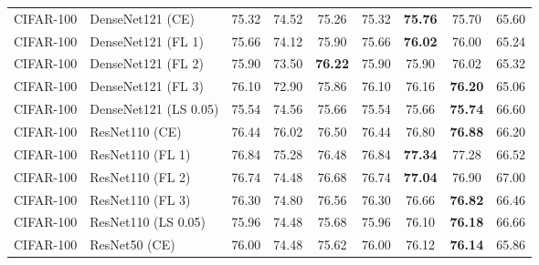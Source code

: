 \begin{table}[h!]
{\begin{tabular}{llccccccc}
   CIFAR-100 &            DenseNet121 (CE) &                  75.32 &                  74.52 &                  75.26 &                  75.32 & \textbf{75.76} &                  75.70 &                  65.60 \\
   CIFAR-100 &          DenseNet121 (FL 1) &                  75.66 &                  74.12 &                  75.90 &                  75.66 & \textbf{76.02} &                  76.00 &                  65.24 \\
   CIFAR-100 &          DenseNet121 (FL 2) &                  75.90 &                  73.50 & \textbf{76.22} &                  75.90 &                  75.90 &                  76.02 &                  65.32 \\
   CIFAR-100 &          DenseNet121 (FL 3) &                  76.10 &                  72.90 &                  75.86 &                  76.10 &                  76.16 & \textbf{76.20} &                  65.06 \\
   CIFAR-100 &       DenseNet121 (LS 0.05) &                  75.54 &                  74.56 &                  75.66 &                  75.54 &                  75.66 & \textbf{75.74} &                  66.60 \\
   CIFAR-100 &              ResNet110 (CE) &                  76.44 &                  76.02 &                  76.50 &                  76.44 &                  76.80 & \textbf{76.88} &                  66.20 \\
   CIFAR-100 &            ResNet110 (FL 1) &                  76.84 &                  75.28 &                  76.48 &                  76.84 & \textbf{77.34} &                  77.28 &                  66.52 \\
   CIFAR-100 &            ResNet110 (FL 2) &                  76.74 &                  74.48 &                  76.68 &                  76.74 & \textbf{77.04} &                  76.90 &                  67.00 \\
   CIFAR-100 &            ResNet110 (FL 3) &                  76.30 &                  74.80 &                  76.56 &                  76.30 &                  76.66 & \textbf{76.82} &                  66.46 \\
   CIFAR-100 &         ResNet110 (LS 0.05) &                  75.96 &                  74.48 &                  75.68 &                  75.96 &                  76.10 & \textbf{76.18} &                  66.66 \\
   CIFAR-100 &               ResNet50 (CE) &                  76.00 &                  74.48 &                  75.62 &                  76.00 &                  76.12 & \textbf{76.14} &                  65.86 \\

\end{tabular}}
\end{table}
